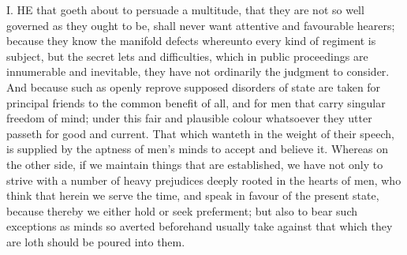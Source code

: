 I. HE that goeth about to persuade a multitude, that they are not so well governed as they ought to be, shall never want attentive and favourable hearers; because they know the manifold defects whereunto every kind of regiment is subject, but the secret lets and difficulties, which in public proceedings are innumerable and inevitable, they have not ordinarily the judgment to consider. And because such as openly reprove supposed disorders of state are taken for principal friends to the common benefit of all, and for men that carry singular freedom of mind; under this fair and plausible colour whatsoever they utter passeth for good and current. That which wanteth in the weight of their speech, is supplied by the aptness of men’s minds to accept and believe it. Whereas on the other side, if we maintain things that are established, we have not only to strive with a number of heavy prejudices deeply rooted in the hearts of men, who think that herein we serve the time, and speak in favour of the present state, because thereby we either hold or seek preferment; but also to bear such exceptions as minds so averted beforehand usually take against that which they are loth should be poured into them.

